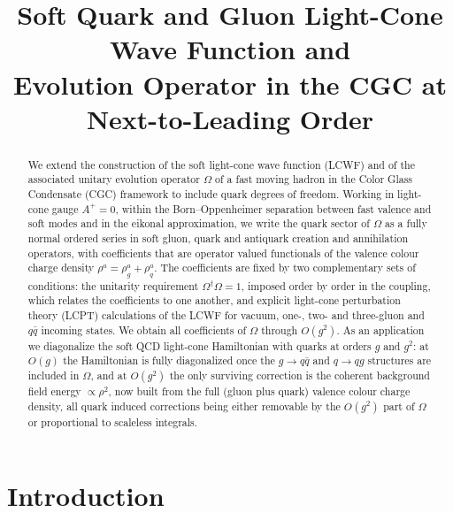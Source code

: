 \documentclass[11pt]{article}
\title{\bf Soft Quark and Gluon Light-Cone Wave Function and\\ Evolution Operator in the CGC at Next-to-Leading Order}
\author{}
\date{}
\newcommand{\dg}{\dagger}
\newcommand{\OM}{\Omega}
\begin{document}
\maketitle
\vspace{-1.4cm}

\begin{abstract}
\noindent
We extend the construction of the soft light-cone wave function (LCWF) and of the associated unitary
evolution operator $\OM$ of a fast moving hadron in the Color Glass Condensate (CGC) framework
to include quark degrees of freedom. Working in light-cone gauge $A^+=0$, within the
Born--Oppenheimer separation between fast valence and soft modes and in the eikonal approximation,
we write the quark sector of $\OM$ as a fully normal ordered series in soft gluon, quark and
antiquark creation and annihilation operators, with coefficients that are operator valued
functionals of the valence colour charge density $\rho^a=\rho^a_g+\rho^a_q$. The coefficients are
fixed by two complementary sets of conditions: the unitarity requirement $\OM^\dg\OM=1$, imposed
order by order in the coupling, which relates the coefficients to one another, and explicit
light-cone perturbation theory (LCPT) calculations of the LCWF for vacuum, one-, two- and
three-gluon and $q\bar q$ incoming states. We obtain all coefficients of $\OM$ through $O(g^2)$.
As an application we diagonalize the soft QCD light-cone Hamiltonian with quarks at orders $g$ and
$g^2$: at $O(g)$ the Hamiltonian is fully diagonalized once the $g\to q\bar q$ and $q\to qg$
structures are included in $\OM$, and at $O(g^2)$ the only surviving correction is the coherent
background field energy $\propto\rho^2$, now built from the full (gluon plus quark) valence colour
charge density, all quark induced corrections being either removable by the $O(g^2)$ part of $\OM$
or proportional to scaleless integrals.
\end{abstract}

\tableofcontents
\bigskip

\section{Introduction}
\end{document}
